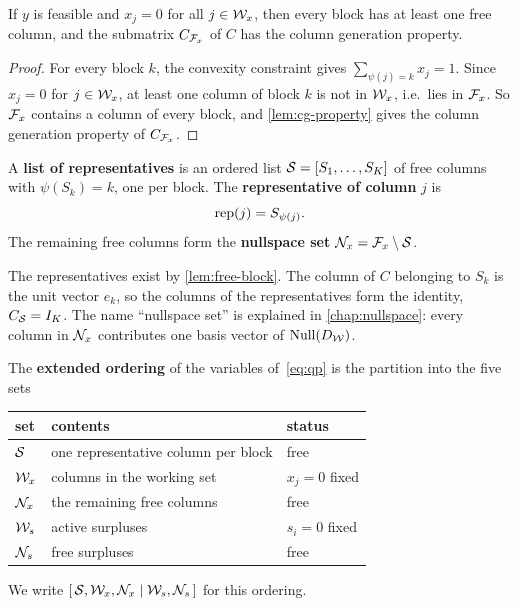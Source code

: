 \begin{lemma} \label{lem:free-block}
If $y$ is feasible and $x_j = 0$ for all $j\in\mathcal{W}_x$, then every block has at least one free
column, and the submatrix $C_{\mathcal{F}_x}$ of $C$ has the column generation property.
\end{lemma}

\begin{proof}
For every block $k$, the convexity constraint gives $\sum_{\psi(j) = k}x_j = 1$. Since
$x_j = 0$ for $j\in\mathcal{W}_x$, at least one column of block $k$ is not in $\mathcal{W}_x$, i.e.\ lies in
$\mathcal{F}_x$. So $\mathcal{F}_x$ contains a column of every block, and \cref{lem:cg-property} gives the
column generation property of $C_{\mathcal{F}_x}$.
\end{proof}

\begin{definition}[Representatives] \label{def:representatives}
A \textbf{list of representatives} is an ordered list $\mathcal{S} = [S_1,\dots,S_K]$ of free
columns with $\psi(S_k) = k$, one per block. The \textbf{representative of column} $j$ is
\[
\operatorname{rep}(j) = S_{\psi(j)} .
\]
The remaining free columns form the \textbf{nullspace set} $\mathcal{N}_x = \mathcal{F}_x\setminus\mathcal{S}$.
\end{definition}

The representatives exist by \cref{lem:free-block}. The column of $C$ belonging to $S_k$ is
the unit vector $e_k$, so the columns of the representatives form the identity,
$C_{\mathcal{S}} = I_K$. The name ``nullspace set'' is explained in \cref{chap:nullspace}: every column
in $\mathcal{N}_x$ contributes one basis vector of $\operatorname{Null}(D_{\mathcal{W}})$.

\begin{definition} \label{def:extended-ordering}
The \textbf{extended ordering} of the variables of~\eqref{eq:qp} is the partition into the
five sets
\begin{center}
\renewcommand{\arraystretch}{1.25}
\begin{tabular}{lll}
\toprule
set & contents & status \\
\midrule
$\mathcal{S}$ & one representative column per block & free \\
$\mathcal{W}_x$   & columns in the working set & $x_j = 0$ fixed \\
$\mathcal{N}_x$   & the remaining free columns & free \\
$\mathcal{W}_s$   & active surpluses & $s_i = 0$ fixed \\
$\mathcal{N}_s$   & free surpluses & free \\
\bottomrule
\end{tabular}
\end{center}
We write $[\,\mathcal{S},\mathcal{W}_x,\mathcal{N}_x\mid\mathcal{W}_s,\mathcal{N}_s\,]$ for this ordering.
\end{definition}

